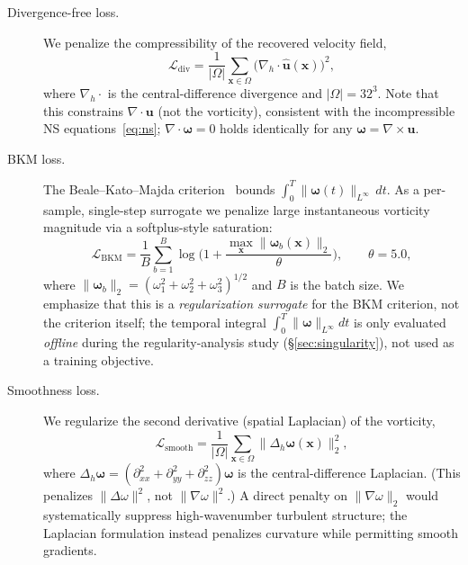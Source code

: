 \documentclass[review]{elsarticle}
\begin{document}
\begin{description}
\item[Divergence-free loss.] We penalize the compressibility of the recovered velocity field,
\begin{equation}
\mathcal{L}_{\text{div}} = \frac{1}{|\Omega|}\sum_{\bm{x}\in\Omega}
\big(\nabla_h \cdot \hat{\bm{u}}(\bm{x})\big)^2,
\label{eq:div}
\end{equation}
where $\nabla_h\cdot$ is the central-difference divergence and $|\Omega|=32^3$. Note that this
constrains $\nabla\cdot\bm{u}$ (not the vorticity), consistent with the incompressible
NS equations~\eqref{eq:ns}; $\nabla\cdot\bm{\omega}=0$ holds identically for any
$\bm{\omega}=\nabla\times\bm{u}$.

\item[BKM loss.] The Beale--Kato--Majda criterion~\cite{beale1984remarks} bounds
$\int_0^T\|\bm{\omega}(t)\|_{L^\infty}\,dt$. As a per-sample, single-step surrogate we penalize
large instantaneous vorticity magnitude via a softplus-style saturation:
\begin{equation}
\mathcal{L}_{\text{BKM}}
= \frac{1}{B}\sum_{b=1}^{B}\log\!\Big(1 + \frac{\max_{\bm{x}}\|\bm{\omega}_b(\bm{x})\|_2}{\theta}\Big),
\qquad \theta = 5.0,
\label{eq:bkm_loss}
\end{equation}
where $\|\bm{\omega}_b\|_2 = (\omega_1^2+\omega_2^2+\omega_3^2)^{1/2}$ and $B$ is the batch size.
We emphasize that this is a \emph{regularization surrogate} for the BKM criterion, not the
criterion itself; the temporal integral $\int_0^T\|\bm{\omega}\|_{L^\infty}dt$ is only evaluated
\emph{offline} during the regularity-analysis study (\S\ref{sec:singularity}), not used as a
training objective.

\item[Smoothness loss.] We regularize the second derivative (spatial Laplacian) of the vorticity,
\begin{equation}
\mathcal{L}_{\text{smooth}}
= \frac{1}{|\Omega|}\sum_{\bm{x}\in\Omega}\|\Delta_h \bm{\omega}(\bm{x})\|_2^2,
\label{eq:smooth}
\end{equation}
where $\Delta_h\bm{\omega} = (\partial_{xx}^2+\partial_{yy}^2+\partial_{zz}^2)\bm{\omega}$ is the
central-difference Laplacian. (This penalizes $\|\Delta\omega\|^2$, not $\|\nabla\omega\|^2$.)
A direct penalty on $\|\nabla\omega\|_2$ would systematically suppress high-wavenumber turbulent
structure; the Laplacian formulation instead penalizes curvature while permitting smooth gradients.


\end{description}
\end{document}
